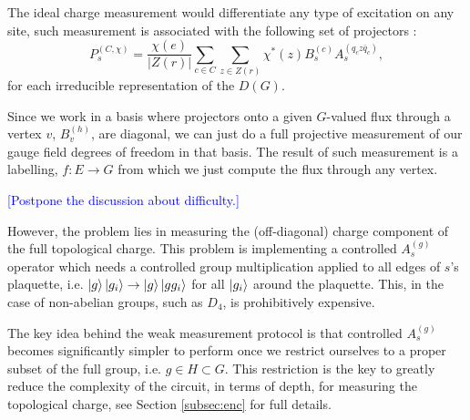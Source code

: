 \documentclass[two column]{article}
\newcommand{\caro}[1]{\textcolor{red}{[#1]}}
\newcommand{\jovan}[1]{\textcolor{blue}{[#1]}}
\begin{document}
The ideal charge measurement would differentiate any type of excitation on any site, such measurement is associated with the following set of projectors \cite{}:
\begin{equation}
    P_s^{(C, \chi)} = \frac{\chi(e)}{|Z(r)|}\sum_{c \in C}\sum_{z \in Z(r)}\chi^*(z)B_s^{(c)}A_s^{(q_c z \bar{q}_c)},
\end{equation}
for each irreducible representation of the $D(G)$.

Since we work in a basis where projectors onto a given $G$-valued flux through a vertex $v$, $B_v^{(h)}$, are diagonal, we can just do a full projective measurement of our gauge field degrees of freedom in that basis. 
The result of such measurement is a labelling, $f: E \rightarrow G$ from which we just compute the flux through any vertex. 

\jovan{Postpone the discussion about difficulty.}

However, the problem lies in measuring the (off-diagonal) charge component of the full topological charge.
This problem is implementing a controlled $A^{(g)}_s$ operator which needs a controlled group multiplication applied to all edges of $s$'s plaquette, i.e. $\ket{g}\ket{g_i} \rightarrow \ket{g}\ket{gg_i}$ for all $\ket{g_i}$ around the plaquette.
This, in the case of non-abelian groups, such as $D_4$, is prohibitively expensive. 



The key idea behind the weak measurement protocol is that controlled $A_s^{(g)}$ becomes significantly simpler to perform once we restrict ourselves to a proper subset of the full group, i.e. $g \in H \subset G$.
This restriction is the key to greatly reduce the complexity of the circuit, in terms of depth, for measuring the topological charge,
see Section \ref{subsec:enc} for full details.
\end{document}
